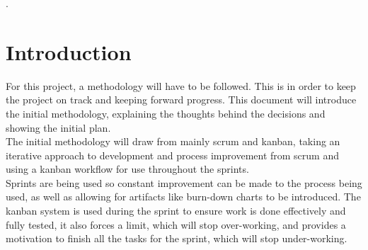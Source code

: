 \documentclass[11pt,fleqn,twoside]{article}
\begin{document}
\wordcount{}

\mmp
 .
\setcounter{tocdepth}{3} %



\section{Introduction}
For this project, a methodology will have to be followed. This is in order to keep the project on track and keeping forward progress. This document will introduce the initial methodology, explaining the thoughts behind the decisions and showing the initial plan.\\

The initial methodology will draw from mainly scrum and kanban, taking an iterative approach to development and process improvement from scrum and using a kanban workflow for use throughout the sprints.\\

Sprints are being used so constant improvement can be made to the process being used, as well as allowing for artifacts like burn-down charts to be introduced. The kanban system is used during the sprint to ensure work is done effectively and fully tested, it also forces a limit, which will stop over-working, and provides a motivation to finish all the tasks for the sprint, which will stop under-working. 
\end{document}
